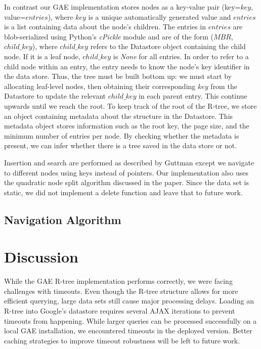\documentclass{scrartcl}
\newcommand{\TODO}[1]{\textcolor{red}{\boxed{\mathbf{TODO }} {\textit{#1}} }}
\begin{document}
In contrast our GAE implementation stores nodes as a key-value pair (key=$key$, value=$entries$), where $key$ is a unique automatically generated value and $entries$ is a list containing data about the node's children. The entries in $entries$ are blob-serialized using Python's \textit{cPickle} module and are of the form ($MBR$, $child\_key$), where $child\_key$ refers to the Datastore object containing the child node. If it is a leaf node, $child\_key$ is \textit{None} for all entries. In order to refer to a child node within an entry, the entry needs to know the node's key identifier in the data store. Thus, the tree must be built bottom up: we must start by allocating leaf-level nodes, then obtaining their corresponding $key$ from the Datastore to update the relevant $child\_key$ in each parent entry. This continue upwards until we reach the root. To keep track of the root of the R-tree, we store an object containing metadata about the structure in the Datastore. This metadata object stores information such as the root key, the page size, and the minimum number of entries per node. By checking whether the metadata is present, we can infer whether there is a tree saved in the data store or not.

Insertion and search are performed as described by Guttman\cite{DBLP:conf/sigmod/Guttman84} except we navigate to different nodes using keys instead of pointers. Our implementation also uses the quadratic node split algorithm discussed in the paper. Since the data set is static, we did not implement a delete function and leave that to future work.


\subsection{Navigation Algorithm}


\section{Discussion}
While the GAE R-tree implementation performs correctly, we were facing challenges with timeouts. Even though the R-tree structure allows for more efficient querying, large data sets still cause major processing delays. Loading an R-tree into Google's datastore requires several AJAX iterations to prevent timeouts from happening. While larger queries can be processed successfully on a local GAE installation, we encountered timeouts in the deployed version. Better caching strategies to improve timeout robustness will be left to future work.
\end{document}

